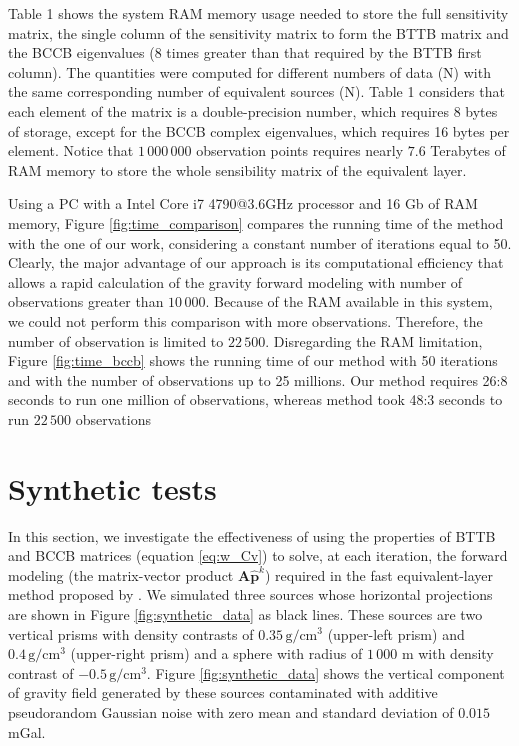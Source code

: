 \documentclass[manuscript,revised]{geophysics}
\begin{document}
Table 1 shows the system RAM memory usage needed to store the full sensitivity matrix, the single column of the sensitivity matrix to form the BTTB matrix and the BCCB eigenvalues ($8$ times greater than that required by the BTTB first column). The quantities were computed for different numbers of data (N) with the same corresponding number of equivalent sources (N). Table 1 considers that each element of the matrix is a double-precision number, which requires 8 bytes of storage, except for the BCCB complex eigenvalues, which requires 16 bytes per element. Notice that $1\,000\,000$ observation points requires nearly $7.6$ Terabytes of RAM memory to store the whole sensibility matrix of the equivalent layer.

Using a PC with a Intel Core i7 4790@3.6GHz processor and 16 Gb of RAM memory, Figure \ref{fig:time_comparison}  compares the running time  of the  \citet{siqueira-etal2017} method with the one of our work, considering a constant number of iterations equal to 50. Clearly, the major advantage of our approach is its computational efficiency that allows a rapid calculation of the gravity forward modeling  with number of observations greater than $10\,000$. Because of the RAM available in this system, we could not perform this comparison with more observations. Therefore, the number of observation is limited to $22\,500$. Disregarding the RAM limitation, Figure \ref{fig:time_bccb} shows the running time of our method with 50 iterations and with the number of observations up to  25 millions. Our method requires 26:8 seconds to run one million of observations, whereas \citet{siqueira-etal2017} method took 48:3 seconds to run $22\,500$ observations


\section{Synthetic tests}
In this section, we  investigate the effectiveness of using the properties of BTTB and BCCB matrices (equation \ref{eq:w_Cv})  to solve, at each iteration, the forward modeling (the matrix-vector product $\mathbf{A} \hat{\mathbf{p}}^k$)  required in the fast equivalent-layer method proposed by \citet{siqueira-etal2017}.  We simulated three sources whose horizontal projections are shown in Figure \ref{fig:synthetic_data} as black lines.  These sources are two vertical prisms with density contrasts of $0.35\, \mathrm{g/cm^3}$ (upper-left prism) and $0.4\, \mathrm{g/cm^3}$ (upper-right prism) and a sphere with radius of $1\,000$ m with density contrast of $-0.5\, \mathrm{g/cm^3}$. Figure \ref{fig:synthetic_data}  shows the vertical component of gravity field generated by these sources contaminated with additive pseudorandom Gaussian noise with zero mean and standard deviation of $0.015$ mGal.
 
\end{document}

